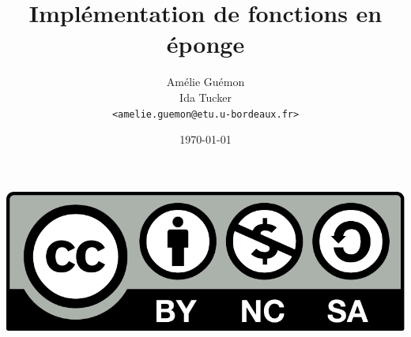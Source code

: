 %
%

\usepackage[french]{babel}
\usepackage{tikz}
\usetikzlibrary{shapes}
\usetikzlibrary{positioning}
\usepackage{color}
\usepackage{amsmath, amsthm, amscd, amssymb, amsfonts, amsxtra}
\usepackage{stmaryrd}

\def\tikzoverlay{
   \tikz[remember picture, overlay]\node[every overlay node]
}

\newcommand{\highlight}[1]{\textcolor{structure.fg}{\bfseries #1}}

\title{Implémentation de fonctions en éponge}

\author[Amélie Guémon \& Ida Tucker]{Amélie Guémon\\Ida Tucker\\[-.25em]
\texttt{\scriptsize <amelie.guemon@etu.u-bordeaux.fr>}\\}


\date{\today}



\begin{frame}
  \vspace{3.5em}
  \titlepage

  \begin{center}
    \includegraphics[scale=.2]{cc-by-nc-sa.pdf}
  \end{center}
\end{frame}


